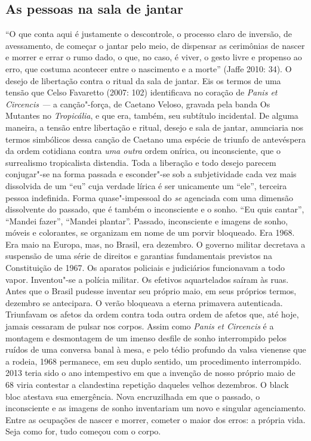 \subsection{As pessoas na sala de jantar}

``O que conta aqui é
justamente o descontrole, o processo claro de inversão, de avessamento,
de começar o jantar pelo meio, de dispensar as cerimônias de nascer e
morrer e errar o rumo dado, o que, no caso, é viver, o gesto livre e
propenso ao erro, que costuma acontecer entre o nascimento e a morte''
(Jaffe 2010: 34). O desejo de libertação contra o ritual da sala de
jantar. Eis os termos de uma tensão que Celso Favaretto (2007: 102)
identificava no coração de \emph{Panis et Circencis ---} a canção"-força,
de Caetano Veloso, gravada pela banda Os Mutantes no 
\emph{Tropicália}, e que era, também, seu subtítulo incidental. De
alguma maneira, a tensão entre libertação e ritual, desejo e sala de
jantar, anunciaria nos termos simbólicos dessa canção de Caetano uma
espécie de triunfo de antevéspera da ordem cotidiana contra \emph{uma
outra} ordem onírica, ou inconsciente, que o surrealismo tropicalista
distendia. Toda a liberação e todo desejo parecem conjugar"-se na forma
passada e esconder"-se sob a subjetividade cada vez mais dissolvida de um
``eu'' cuja verdade lírica é ser unicamente um ``ele'', terceira pessoa
indefinida. Forma quase"-impessoal do \emph{se} agenciada com uma
dimensão dissolvente do passado, que é também o inconsciente e o sonho.
``Eu quis cantar'', ``Mandei fazer'', ``Mandei plantar''. Passado,
inconsciente e imagens de sonho, móveis e colorantes, se organizam em
nome de um porvir bloqueado. Era 1968. Era maio na Europa, mas, no
Brasil, era dezembro. O governo militar decretava a suspensão de uma
série de direitos e garantias fundamentais previstos na Constituição de
1967. Os aparatos policiais e judiciários funcionavam a todo vapor.
Inventou"-se a polícia militar. Os efetivos aquartelados saíram às ruas.
Antes que o Brasil pudesse inventar seu próprio maio, em seus próprios
termos, dezembro se antecipara. O verão bloqueava a eterna primavera
autenticada. Triunfavam os afetos da ordem contra toda outra ordem de
afetos que, até hoje, jamais cessaram de pulsar nos corpos. Assim como
\emph{Panis et Circencis} é a montagem e desmontagem de um imenso
desfile de sonho interrompido pelos ruídos de uma conversa banal à mesa,
e pelo tédio profundo da valsa vienense que a rodeia, 1968 permanece, em
seu duplo sentido, um procedimento interrompido. 2013 teria sido o ano
intempestivo em que a invenção de nosso próprio maio de 68 viria
contestar a clandestina repetição daqueles velhos dezembros. O black
bloc atestava sua emergência. Nova encruzilhada em que o passado, o
inconsciente e as imagens de sonho inventariam um novo e singular
agenciamento. Entre as ocupações de nascer e morrer, cometer o maior dos
erros: a própria vida. Seja como for, tudo começou com o corpo.

